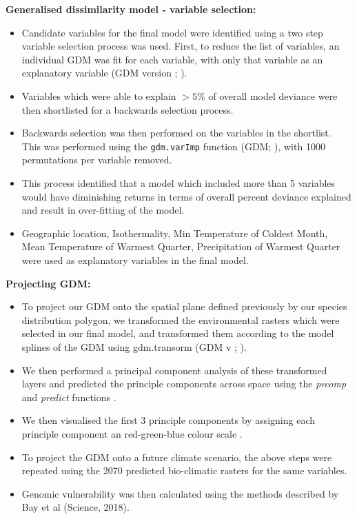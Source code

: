 \textbf{Generalised dissimilarity model - variable selection:}
\begin{itemize}
\item Candidate variables for the final model were identified using a two step variable selection process was used. First, to reduce the list of variables, an individual GDM was fit for each variable, with only that variable as an explanatory variable (GDM version ; \cite{Ferrier2007}).
\item Variables which were able to explain $>5\%$ of overall model deviance were then shortlisted for a backwards selection process.
\item Backwards selection was then performed on the variables in the shortlist. This was performed using the \texttt{gdm.varImp} function (GDM; \cite{Ferrier2007}), with 1000 permutations per variable removed.
\item This process identified that a model which included more than 5 variables would have diminishing returns in terms of overall percent deviance explained and result in over-fitting of the model.
\item Geographic location, Isothermality, Min Temperature of Coldest Month, Mean Temperature of Warmest Quarter, Precipitation of Warmest Quarter were used as explanatory variables in the final model.
\end{itemize}

\textbf{Projecting GDM:}
\begin{itemize}
\item To project our GDM onto the spatial plane defined previously by our species distribution polygon, we transformed the environmental rasters which were selected in our final model, and transformed them according to the model splines of the GDM using gdm.transorm (GDM v ; \cite{Ferrier2007}).
\item We then performed a principal component analysis of these transformed layers and predicted the principle components across space using the \textit{prcomp} and \textit{predict} functions \cite{TeamRDevelopmentCore2011}.
\item We then visualised the first 3 principle components by assigning each principle component an red-green-blue colour scale \cite{Rstoolbox}.
\item To project the GDM onto a future climate scenario, the above steps were repeated using the 2070 predicted bio-climatic rasters for the same variables.
\item Genomic vulnerability was then calculated using the methods described by Bay et al (Science, 2018).
\end{itemize}

